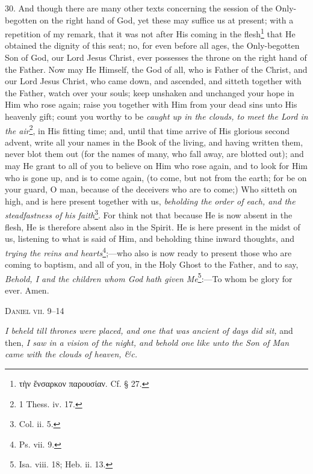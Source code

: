 30. And though there are many other texts concerning the session of the Only-begotten on the right hand of God, yet these may suffice us at present; with a repetition of my remark, that it was not after His coming in the flesh\footnote{\textgreek{τὴν ἔνσαρκον παρουσίαν}. Cf. § 27.} that He obtained the dignity of this seat; no, for even before all ages, the Only-begotten Son of God, our Lord Jesus Christ, ever possesses the throne on the right hand of the Father. Now may He Himself, the God of all, who is Father of the Christ, and our Lord Jesus Christ, who came down, and ascended, and sitteth together with the Father, watch over your souls; keep unshaken and unchanged your hope in Him who rose again; raise you together with Him from your dead sins unto His heavenly gift; count you worthy to be \emph{caught up in the clouds, to meet the Lord in the air}\footnote{1 Thess. iv. 17.}, in His fitting time; and, until that time arrive of His glorious second advent, write all your names in the Book of the living, and having written them, never blot them out (for the names of many, who fall away, are blotted out); and may He grant to all of you to believe on Him who rose again, and to look for Him who is gone up, and is to come again, (to come, but not from the earth; for be on your guard, O man, because of the deceivers who are to come;) Who sitteth on high, and is here present together with us, \emph{beholding the} \emph{order of each, and the steadfastness of his faith}\footnote{Col. ii. 5.}. For think not that because He is now absent in the flesh, He is therefore absent also in the Spirit. He is here present in the midst of us, listening to what is said of Him, and beholding thine inward thoughts, and \emph{trying the reins and hearts}\footnote{Ps. vii. 9.};—who also is now ready to present those who are coming to baptism, and all of you, in the Holy Ghost to the Father, and to say, \emph{Behold, I and the children whom God hath given Me}\footnote{Isa. viii. 18; Heb. ii. 13.}:—To whom be glory for ever. Amen.


\textsc{Daniel vii. 9–14}

\emph{I beheld till thrones were placed, and one that was ancient of days did sit,} and then, \emph{I saw in a vision of the night, and behold one like unto the Son of Man came with the clouds of heaven, \&c.}

